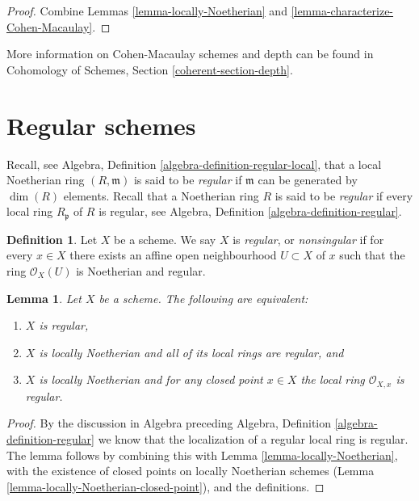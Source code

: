 \documentclass{stacks-project}
\theoremstyle{plain}
\newtheorem{lemma}[subsection]{Lemma}
\theoremstyle{definition}
\newtheorem{definition}[subsection]{Definition}
\theoremstyle{remark}
\numberwithin{equation}{subsection}
\begin{document}
\begin{proof}
Combine Lemmas \ref{lemma-locally-Noetherian}
and \ref{lemma-characterize-Cohen-Macaulay}.
\end{proof}

\noindent
More information on Cohen-Macaulay schemes and depth can be found in
Cohomology of Schemes, Section \ref{coherent-section-depth}.








\section{Regular schemes}
\label{section-regular}

\noindent
Recall, see Algebra, Definition \ref{algebra-definition-regular-local},
that a local Noetherian ring $(R, \mathfrak m)$ is
said to be {\it regular} if $\mathfrak m$ can be generated
by $\dim(R)$ elements.
Recall that a Noetherian ring $R$ is said to be {\it regular} if
every local ring $R_{\mathfrak p}$ of $R$ is regular,
see Algebra, Definition \ref{algebra-definition-regular}.

\begin{definition}
\label{definition-regular}
Let $X$ be a scheme. We say $X$ is {\it regular}, or {\it nonsingular} if
for every $x \in X$ there exists an affine open neighbourhood
$U \subset X$ of $x$ such that the ring $\mathcal{O}_X(U)$ is
Noetherian and regular.
\end{definition}

\begin{lemma}
\label{lemma-characterize-regular}
Let $X$ be a scheme. The following are equivalent:
\begin{enumerate}
\item $X$ is regular,
\item $X$ is locally Noetherian and all of its local rings are regular,
and
\item $X$ is locally Noetherian and for any closed point $x \in X$
the local ring $\mathcal{O}_{X, x}$ is regular.
\end{enumerate}
\end{lemma}

\begin{proof}
By the discussion in Algebra preceding Algebra, Definition
\ref{algebra-definition-regular} we know that the localization of
a regular local ring is regular. The lemma follows
by combining this with Lemma \ref{lemma-locally-Noetherian},
with the existence of closed
points on locally Noetherian schemes
(Lemma \ref{lemma-locally-Noetherian-closed-point}), and
the definitions.
\end{proof}
\end{document}
